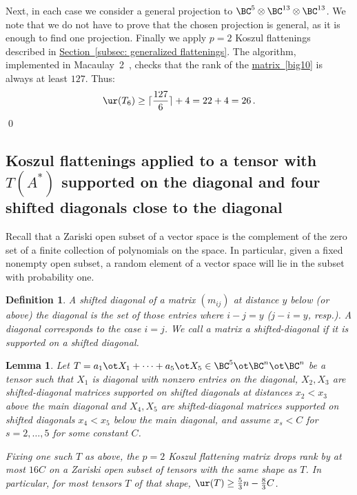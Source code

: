 \documentclass[11pt]{article}
\newcommand{\expref}[2]{\texorpdfstring{\hyperref[#2]{#1~\ref{#2}}}{#1~\ref{#2}}}
\newcommand{\expeqref}[2]{\texorpdfstring{\hyperref[#2]{#1~\eqref{#2}}}{#1~\eqref{#2}}}
\newtheorem{lemma}[theorem]{Lemma}
\newtheorem{definition}[theorem]{Definition}
\begin{document}
Next, in each case we consider a general projection to $\BC^5\otimes \BC^{13}\otimes \BC^{13}$. We note that we do not have to prove that the chosen projection is general, as it is enough to find one projection. 
Finally we apply $p=2$ Koszul flattenings described in \expref{Section}{subsec: generalized flattenings}. The algorithm, implemented in Macaulay~2~\cite{M2}, checks
that  %
the rank of
the \expeqref{matrix}{big10}  %
is always at least $127$.  Thus:  %
\[ \ur (T_6)\geq \lceil \frac{127}{6}\rceil+4=22+4=26\,. \qedhere \]
\qed

\subsection{Koszul flattenings applied to  a tensor with $T(A^*)$ supported on the diagonal
  and four  
%
  shifted diagonals close to the diagonal}

Recall that a Zariski open subset of a vector space is the complement of the zero set of a finite
collection of polynomials on the space. In particular, given a fixed nonempty open subset, a random
element of a vector space will lie in the subset with probability one.
\begin{definition}
%
  A 
%
shifted   
  diagonal of a matrix $(m_{ij})$
 at distance $y$ below %
 (or above) %
 the diagonal
 is the set of those entries where $i - j = y$ %
 ($j-i=y$, resp.).
 A diagonal corresponds to the case $i = j$.  We call a matrix a
%
shifted-diagonal if it is
 supported on a 
shifted 
 diagonal.
 \end{definition}

 \begin{lemma}\label{neardiagcase}
Let $T=a_1\ot X_1+\cdots + a_5\ot X_5\in \BC^5\ot \BC^n\ot \BC^n$ be a tensor such that
$X_1$ is diagonal with nonzero entries on the diagonal, 
 $X_2,X_3$ are 
%
 shifted-diagonal matrices supported on 
%
shifted 
 diagonals
at distances  $x_2< x_3$
above the main diagonal and $X_4,X_5$ are 
%
 shifted-diagonal matrices  supported on 
%
shifted 
  diagonals $x_4<x_5$
below the main diagonal, and assume $x_s<C$ for $s=2,\ldots,5$ for some constant $C$.

Fixing one such $T$  as above,    the $p=2$ Koszul flattening matrix drops rank by at most
$16C$ on a Zariski open subset of tensors with the same  shape as $T$. 
In particular, for most  tensors $T$ of that shape, 
$\ur(T)\geq \frac 53 n-\frac 83 C$. 
\end{lemma}
\end{document}
